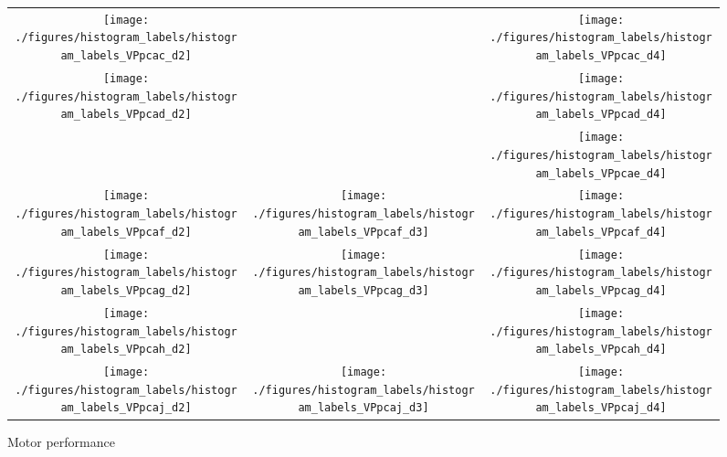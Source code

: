 
\begin{figure*}
	\centering
	\def \subplotwidth {0.24\textwidth}
\begin{tabular}{cc|c}

\texttt{[image: ./figures/histogram\_labels/histogram\_labels\_VPpcac\_d2]}& & \texttt{[image: ./figures/histogram\_labels/histogram\_labels\_VPpcac\_d4]}\\
\texttt{[image: ./figures/histogram\_labels/histogram\_labels\_VPpcad\_d2]}& & \texttt{[image: ./figures/histogram\_labels/histogram\_labels\_VPpcad\_d4]}\\
& & \texttt{[image: ./figures/histogram\_labels/histogram\_labels\_VPpcae\_d4]}\\
\texttt{[image: ./figures/histogram\_labels/histogram\_labels\_VPpcaf\_d2]}& \texttt{[image: ./figures/histogram\_labels/histogram\_labels\_VPpcaf\_d3]}& \texttt{[image: ./figures/histogram\_labels/histogram\_labels\_VPpcaf\_d4]}\\
\texttt{[image: ./figures/histogram\_labels/histogram\_labels\_VPpcag\_d2]}& \texttt{[image: ./figures/histogram\_labels/histogram\_labels\_VPpcag\_d3]}& \texttt{[image: ./figures/histogram\_labels/histogram\_labels\_VPpcag\_d4]}\\
\texttt{[image: ./figures/histogram\_labels/histogram\_labels\_VPpcah\_d2]}& & \texttt{[image: ./figures/histogram\_labels/histogram\_labels\_VPpcah\_d4]}\\
\texttt{[image: ./figures/histogram\_labels/histogram\_labels\_VPpcaj\_d2]}& \texttt{[image: ./figures/histogram\_labels/histogram\_labels\_VPpcaj\_d3]}& \texttt{[image: ./figures/histogram\_labels/histogram\_labels\_VPpcaj\_d4]}\\
\end{tabular}
\caption{Motor performance}
\end{figure*}